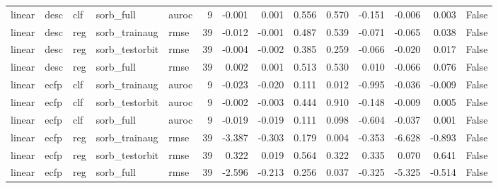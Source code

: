 \begin{table}
\begin{tabular}{lllllrrrrrrrrr}
linear & desc & clf & sorb\_full & auroc & 9 & -0.001 & 0.001 & 0.556 & 0.570 & -0.151 & -0.006 & 0.003 & False \\
linear & desc & reg & sorb\_trainaug & rmse & 39 & -0.012 & -0.001 & 0.487 & 0.539 & -0.071 & -0.065 & 0.038 & False \\
linear & desc & reg & sorb\_testorbit & rmse & 39 & -0.004 & -0.002 & 0.385 & 0.259 & -0.066 & -0.020 & 0.017 & False \\
linear & desc & reg & sorb\_full & rmse & 39 & 0.002 & 0.001 & 0.513 & 0.530 & 0.010 & -0.066 & 0.076 & False \\
linear & ecfp & clf & sorb\_trainaug & auroc & 9 & -0.023 & -0.020 & 0.111 & 0.012 & -0.995 & -0.036 & -0.009 & False \\
linear & ecfp & clf & sorb\_testorbit & auroc & 9 & -0.002 & -0.003 & 0.444 & 0.910 & -0.148 & -0.009 & 0.005 & False \\
linear & ecfp & clf & sorb\_full & auroc & 9 & -0.019 & -0.019 & 0.111 & 0.098 & -0.604 & -0.037 & 0.001 & False \\
linear & ecfp & reg & sorb\_trainaug & rmse & 39 & -3.387 & -0.303 & 0.179 & 0.004 & -0.353 & -6.628 & -0.893 & False \\
linear & ecfp & reg & sorb\_testorbit & rmse & 39 & 0.322 & 0.019 & 0.564 & 0.322 & 0.335 & 0.070 & 0.641 & False \\
linear & ecfp & reg & sorb\_full & rmse & 39 & -2.596 & -0.213 & 0.256 & 0.037 & -0.325 & -5.325 & -0.514 & False \\
\bottomrule
\end{tabular}
\end{table}
